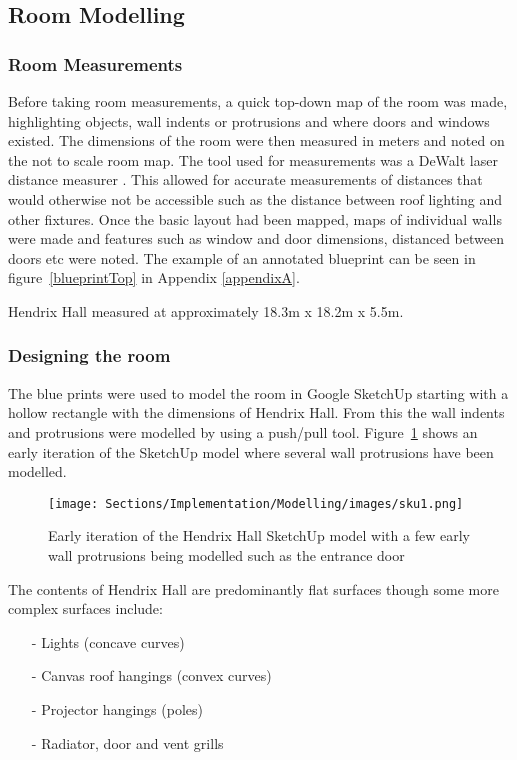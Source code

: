 \documentclass[../../main.tex]{subfiles}
\begin{document}
	\subsection{Room Modelling}

		\subsubsection{Room Measurements}

			Before taking room measurements, a quick top-down map of the room was made, highlighting objects, wall indents or protrusions and where doors and windows existed. The dimensions of the room were then measured in meters and noted on the not to scale room map. The tool used for measurements was a DeWalt laser distance measurer \cite{dewalt}. This allowed for accurate measurements of distances that would otherwise not be accessible such as the distance between roof lighting and other fixtures. Once the basic layout had been mapped, maps of individual walls were made and features such as window and door dimensions, distanced between doors etc were noted. The example of an annotated blueprint can be seen in figure~\ref{blueprintTop} in Appendix \ref{appendixA}.

			Hendrix Hall measured at approximately 18.3m x 18.2m x 5.5m.

		\subsubsection{Designing the room}
			\label{designRoom}
			The blue prints were used to model the room in Google SketchUp starting with a hollow rectangle with the dimensions of Hendrix Hall. From this the wall indents and protrusions were modelled by using a push/pull tool. Figure~\ref{sku1} shows an early iteration of the SketchUp model where several wall protrusions have been modelled.

			\begin{figure}[ht]
				\center\texttt{[image: Sections/Implementation/Modelling/images/sku1.png]}
				\caption{Early iteration of the Hendrix Hall SketchUp model with a few early wall protrusions being modelled such as the entrance door}
				\label{sku1}
			\end{figure}

			The contents of Hendrix Hall are predominantly flat surfaces though some more complex surfaces include:

			\begin{itemize}
				\item[-] Lights (concave curves) 
				\item[-] Canvas roof hangings (convex curves) 
				\item[-] Projector hangings (poles)
				\item[-] Radiator, door and vent grills \\
			\end{itemize}
\end{document}

